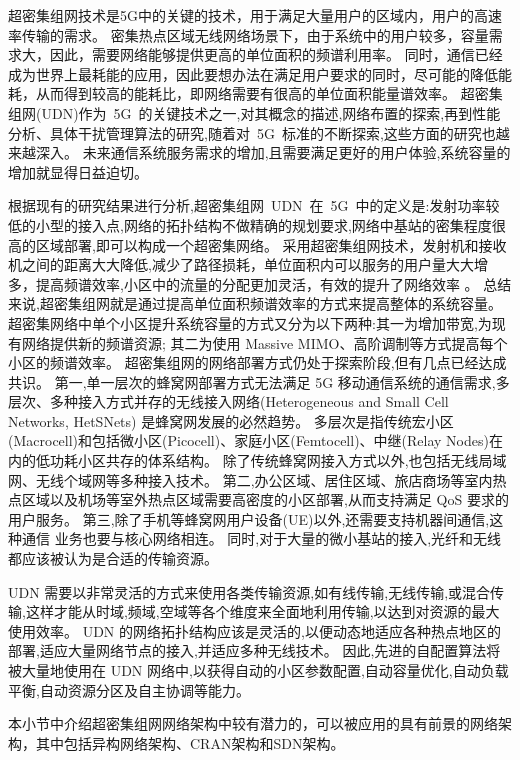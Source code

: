 超密集组网技术是5G中的关键的技术，用于满足大量用户的区域内，用户的高速率传输的需求。
密集热点区域无线网络场景下，由于系统中的用户较多，容量需求大，因此，需要网络能够提供更高的单位面积的频谱利用率。
同时，通信已经成为世界上最耗能的应用，因此要想办法在满足用户要求的同时，尽可能的降低能耗，从而得到较高的能耗比，即网络需要有很高的单位面积能量谱效率。
超密集组网(UDN)作为~5G~的关键技术之一,对其概念的描述,网络布置的探索,再到性能分析、具体干扰管理算法的研究,随着对~5G~标准的不断探索,这些方面的研究也越来越深入。
未来通信系统服务需求的增加,且需要满足更好的用户体验,系统容量的增加就显得日益迫切。

根据现有的研究结果进行分析,超密集组网~UDN~在~5G~中的定义是:发射功率较低的小型的接入点,网络的拓扑结构不做精确的规划要求,网络中基站的密集程度很高的区域部署,即可以构成一个超密集网络。
采用超密集组网技术，发射机和接收机之间的距离大大降低,减少了路径损耗，单位面积内可以服务的用户量大大增多，提高频谱效率,小区中的流量的分配更加灵活，有效的提升了网络效率 。
总结来说,超密集组网就是通过提高单位面积频谱效率的方式来提高整体的系统容量。
超密集网络中单个小区提升系统容量的方式又分为以下两种:其一为增加带宽,为现有网络提供新的频谱资源;
其二为使用 Massive MIMO、高阶调制等方式提高每个小区的频谱效率。
超密集组网的网络部署方式仍处于探索阶段,但有几点已经达成共识。
第一,单一层次的蜂窝网部署方式无法满足 5G 移动通信系统的通信需求,多层次、多种接入方式并存的无线接入网络(Heterogeneous and Small Cell Networks, HetSNets)
是蜂窝网发展的必然趋势。
多层次是指传统宏小区(Macrocell)和包括微小区(Picocell)、家庭小区(Femtocell)、中继(Relay Nodes)在内的低功耗小区共存的体系结构。
除了传统蜂窝网接入方式以外,也包括无线局域网、无线个域网等多种接入技术。
第二,办公区域、居住区域、旅店商场等室内热点区域以及机场等室外热点区域需要高密度的小区部署,从而支持满足 QoS 要求的用户服务。
第三,除了手机等蜂窝网用户设备(UE)以外,还需要支持机器间通信,这种通信
业务也要与核心网络相连。
同时,对于大量的微小基站的接入,光纤和无线都应该被认为是合适的传输资源。

UDN 需要以非常灵活的方式来使用各类传输资源,如有线传输,无线传输,或混合传输,这样才能从时域,频域,空域等各个维度来全面地利用传输,以达到对资源的最大使用效率。
UDN 的网络拓扑结构应该是灵活的,以便动态地适应各种热点地区的部署,适应大量网络节点的接入,并适应多种无线技术。
因此,先进的自配置算法将被大量地使用在 UDN 网络中,以获得自动的小区参数配置,自动容量优化,自动负载平衡,自动资源分区及自主协调等能力。

本小节中介绍超密集组网网络架构中较有潜力的，可以被应用的具有前景的网络架构，其中包括异构网络架构、CRAN架构和SDN架构。

